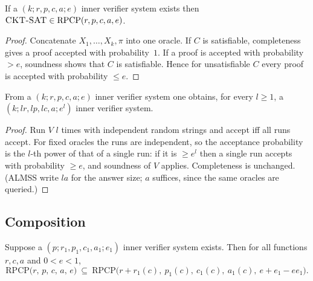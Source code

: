 \begin{proposition}\label{prop:in-out}
If a $(k;r,p,c,a;e)$ inner verifier system exists then $\textsc{CKT-SAT}\in\mathrm{RPCP}(r,p,c,a,e)$.
\end{proposition}
\begin{proof}
Concatenate $X_1,\dots,X_k,\pi$ into one oracle.  If $C$ is satisfiable, completeness gives a proof accepted with probability~$1$.  If a proof is accepted with probability $>e$, soundness shows that
$C$ is satisfiable.  Hence for unsatisfiable $C$ every proof is accepted with probability $\le e$.
\end{proof}

\begin{proposition}[Repetition]\label{prop:rep}
From a $(k;r,p,c,a;e)$ inner verifier system one obtains, for every $l\ge1$, a $(k;lr,lp,lc,a;e^l)$ inner verifier system.
\end{proposition}
\begin{proof}
Run $V$ $l$ times with independent random strings and accept iff all runs accept.  For fixed oracles the runs are independent, so the acceptance probability is the $l$-th power of that of a single run:
if it is $\ge e^l$ then a single run accepts with probability $\ge e$, and soundness of $V$ applies.  Completeness is unchanged.  (ALMSS write $la$ for the answer size; $a$ suffices, since the same oracles are queried.)
\end{proof}

\subsection{Composition}

\begin{theorem}\label{thm:compose}
Suppose a $(p;r_1,p_1,c_1,a_1;e_1)$ inner verifier system exists.  Then for all functions $r,c,a$ and $0<e<1$,
\[
  \mathrm{RPCP}\bigl(r,\,p,\,c,\,a,\,e\bigr)\ \subseteq\ \mathrm{RPCP}\bigl(r+r_1(c),\ p_1(c),\ c_1(c),\ a_1(c),\ e+e_1-ee_1\bigr).
\]
\end{theorem}

